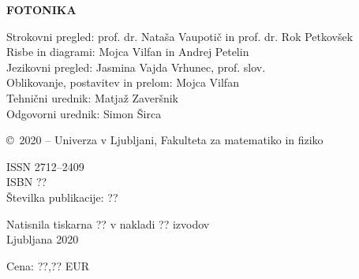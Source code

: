 \documentclass[a4paper,10pt,fleqn]{book}
\begin{document}
\bigskip
\textbf{FOTONIKA}

\bigskip
\bigskip
Strokovni pregled: prof. dr. Nataša Vaupotič in prof. dr. Rok Petkovšek \\
Risbe in diagrami: Mojca Vilfan in Andrej Petelin \\
Jezikovni pregled: Jasmina Vajda Vrhunec, prof. slov. \\
Oblikovanje, postavitev in prelom: Mojca Vilfan \\
Tehnični urednik: Matjaž Zaveršnik \\
Odgovorni urednik: Simon Širca

\bigskip
\copyright\ 2020 -- Univerza v Ljubljani, Fakulteta za matematiko in fiziko

\bigskip
ISSN 2712--2409 \\
ISBN ?? \\
Številka publikacije: ??

\bigskip
Natisnila tiskarna ?? v nakladi ?? izvodov \\
Ljubljana 2020

\bigskip
Cena: ??,?? {\small EUR}

\end{document}
